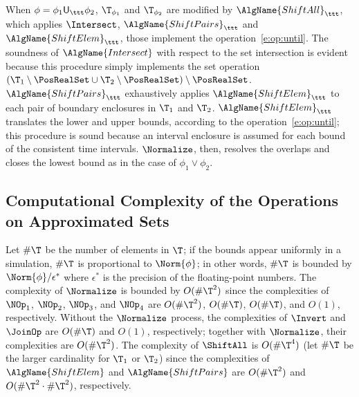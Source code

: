\documentclass[paper]{ieice}
\newcommand{\Until}{\mathsf{U}}
\begin{document}
When $\phi = \phi_1 \Until_\ttt \phi_2$, $\T_{\phi_1}$ and $\T_{\phi_2}$ are modified by $\AlgName{ShiftAll}_\ttt$, which applies $\Intersect$, $\AlgName{ShiftPairs}_\ttt$ and $\AlgName{ShiftElem}_\ttt$, those implement the operation~\eqref{e:op:until}.
The soundness of $\AlgName{Intersect}$ with respect to the set intersection is evident because this procedure simply implements the set operation $(\T_1\setminus\PosRealSet \cup \T_2\setminus\PosRealSet)\setminus\PosRealSet$.
$\AlgName{ShiftPairs}_\ttt$ exhaustively applies $\AlgName{ShiftElem}_\ttt$ to each pair of boundary enclosures in $\T_1$ and $\T_2$.
$\AlgName{ShiftElem}_\ttt$ translates the lower and upper bounds, according to the operation~\eqref{e:op:until}; this procedure is sound because an interval enclosure is assumed for each bound of the consistent time intervals.
$\Normalize$, then, resolves the overlaps and closes the lowest bound as in the case of $\phi_1 \lor \phi_2$.
\Qed


\subsection{Computational Complexity of the Operations on Approximated Sets}
\label{s:complexity:op}

Let $\#\T$ be the number of elements in $\T$;
if the bounds appear uniformly in a simulation, $\#\T$ is proportional to $\Norm{\phi}$;
in other words, $\#\T$ is bounded by $\Norm{\phi}/\epsilon^*$ where $\epsilon^*$ is the precision of the floating-point numbers.
The complexity of $\Normalize$ is bounded by $O(\#\T^2)$ since the complexities of $\NOp_1$, $\NOp_2$, $\NOp_3$, and $\NOp_4$ are $O(\#\T^2)$, $O(\#\T)$, $O(\#\T)$, and $O(1)$, respectively.
Without the $\Normalize$ process, the complexities of $\Invert$ and $\JoinOp$ are $O(\#\T)$ and $O(1)$, respectively; together with $\Normalize$, their complexities are $O(\#\T^2)$.
The complexity of $\ShiftAll$ is $O(\#\T^4)$ (let $\#\T$ be the larger cardinality for $\T_1$ or $\T_2$) since the complexities of $\AlgName{ShiftElem}$ and $\AlgName{ShiftPairs}$ are $O(\#\T^2)$ and $O(\#\T^2 \cdot \#\T^2)$, respectively.



\newpage

\label{profile}
\end{document}
